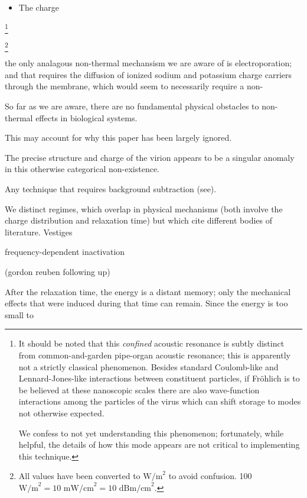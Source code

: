 \documentclass[paper.tex]{subfiles}
\begin{document}
\begin{multicols}{1}
\begin{itemize}
	\item The charge 
\end{itemize}

\footnote{It should be noted that this {\it confined} acoustic resonance is subtly distinct from common-and-garden pipe-organ acoustic resonance; this is apparently not a strictly classical phenomenon. Besides standard Coulomb-like and Lennard-Jones-like interactions between constituent particles, if Fr\"{o}hlich is to be believed at these nanoscopic scales there are also wave-function interactions among the particles of the virus which can shift storage to modes not otherwise expected.
	
	We confess to not yet understanding this phenomenon; fortunately, while helpful, the details of how this mode appears are not critical to implementing this technique.}


\footnote{All values have been converted to $\text{W/m}^2$ to avoid confusion. 100 $\text{W/m}^2 = 10 \text{ mW/cm}^2 = 10 \text{ dBm/cm}^2$.}




the only analagous non-thermal mechansism we are aware of is electroporation; and that requires the diffusion of ionized sodium and potassium charge carriers through the membrane, which would seem to necessarily require a non-



So far as we are aware, there are no fundamental physical obstacles to non-thermal effects in biological systems. 


This may account for why this paper has been largely ignored.

The precise structure and charge of the virion appears to be a singular anomaly in this otherwise categorical non-existence.





Any technique that requires background subtraction (see).


We distinct regimes, which overlap in physical mechanisms (both involve the charge distribution and relaxation time) but which cite different bodies of literature. Vestiges 

frequency-dependent inactivation

(gordon reuben following up)




After the relaxation time, the energy is a distant memory; only the mechanical effects that were induced during that time can remain. Since the energy is too small to 



\end{multicols}
\end{document}
